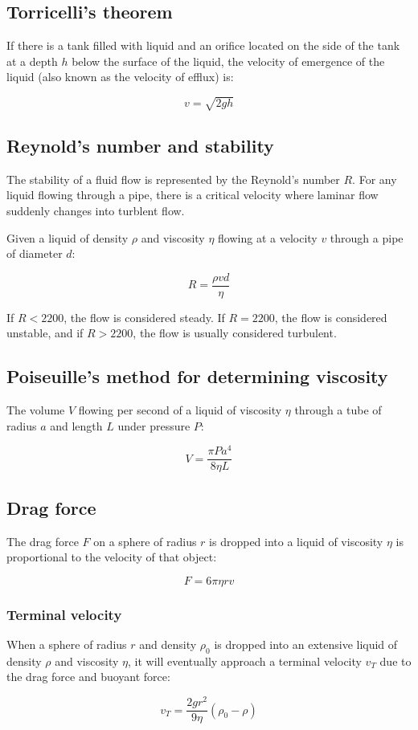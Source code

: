 \documentclass[12pt]{article}
\begin{document}
\subsection{Torricelli's theorem}

If there is a tank filled with liquid and an orifice located on the side of the tank at a depth $h$ below the surface of the liquid, the velocity of emergence of the liquid (also known as the velocity of efflux) is:

\[
\boxed{
v = \sqrt{2gh}
}
\]

\newpage

\subsection{Reynold's number and stability}

The stability of a fluid flow is represented by the Reynold's number $R$.
For any liquid flowing through a pipe, there is a critical velocity where laminar flow suddenly changes into turblent flow.

Given a liquid of density $\rho$ and viscosity $\eta$ flowing at a velocity $v$ through a pipe of diameter $d$:

\[
\boxed{
R = \frac{\rho v d}{\eta}
}
\]

If $R < 2200$, the flow is considered steady. If $R = 2200$, the flow is considered unstable, and if $R > 2200$, the flow is usually considered turbulent.

\subsection{Poiseuille's method for determining viscosity}

The volume $V$ flowing per second of a liquid of viscosity $\eta$ through a tube of radius $a$ and length $L$ under pressure $P$:

\[
\boxed{
V = \frac{\pi P a^4}{8\eta L}
}
\]

\subsection{Drag force}

The drag force $F$ on a sphere of radius $r$ is dropped into a liquid of viscosity $\eta$ is proportional to the velocity of that object:

\[
\boxed{
F = 6 \pi \eta r v
}
\]

\subsubsection{Terminal velocity}

When a sphere of radius $r$ and density $\rho_0$ is dropped into an extensive liquid of density $\rho$ and viscosity $\eta$, it will eventually approach a terminal velocity $v_T$ due to the drag force and buoyant force:

\[
\boxed{
v_T = \frac{2gr^2}{9\eta}(\rho_0 - \rho)
}
\]
\end{document}
